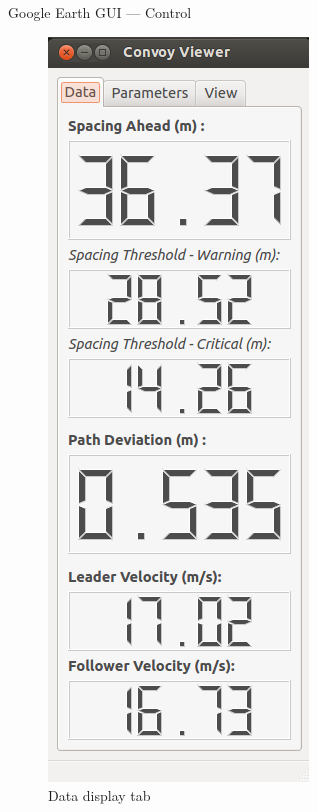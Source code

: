 \documentclass{beamer}
\begin{document}
    \begin{frame}{Google Earth GUI --- Control}
      \begin{figure}[!htb] %
         \centering
          \includegraphics[height=0.85\textheight]{../graphics/earth_data.png}
          \caption{\footnotesize Data display tab}
        \endminipage\hfill
         \centering

\end{figure}
\end{frame}
\end{document}
